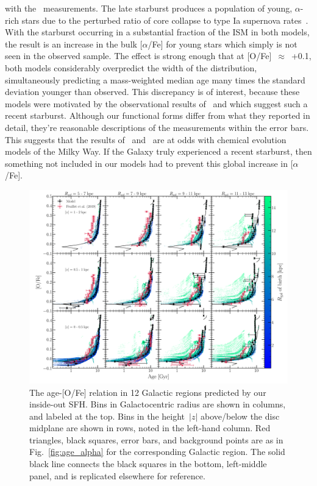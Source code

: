 \documentclass[fleqn, usenatbib]{mnras}
\begin{document}
with the~\citet{Feuillet2019} measurements. The late starburst produces a 
population of young, $\alpha$-rich stars due to the perturbed ratio of core 
collapse to type Ia supernova rates~\citep{Johnson2020}. With the starburst 
occurring in a substantial fraction of the ISM in both models, the result is an 
increase in the bulk [$\alpha$/Fe] for young stars which simply is not seen in 
the observed sample. The effect is strong enough that at [O/Fe]~$\approx$~+0.1, 
both models considerably overpredict the width of the distribution, 
simultaneously predicting a mass-weighted median age many times the standard 
deviation younger than observed. This discrepancy is of interest, because these 
models were motivated by the observational results of~\citet{Mor2019} and 
\citet{Isern2019} which suggest such a recent starburst. Although our 
functional forms differ from what they reported in detail, they're reasonable 
descriptions of the measurements within the error bars. This suggests that the 
results of~\citet{Mor2019} and~\citet{Isern2019} are at odds with chemical 
evolution models of the Milky Way. If the Galaxy truly experienced a recent 
starburst, then something not included in our models had to prevent this global 
increase in [$\alpha$/Fe]. 

\begin{figure} 
\centering 
\includegraphics[scale = 0.32]{age_alpha_regions.pdf} 
\caption{The age-[O/Fe] relation in 12 Galactic regions predicted by our 
inside-out SFH. Bins in Galactocentric radius are shown in columns, and labeled 
at the top. Bins in the height~$\left|z\right|$ above/below the disc midplane 
are shown in rows, noted in the left-hand column. Red triangles, black squares, 
error bars, and background points are as in Fig.~\ref{fig:age_alpha} for the 
corresponding Galactic region. The solid black line connects the black squares 
in the bottom, left-middle panel, and is replicated elsewhere for reference. } 
\label{fig:age_alpha_regions} 
\end{figure} 
\end{document}
